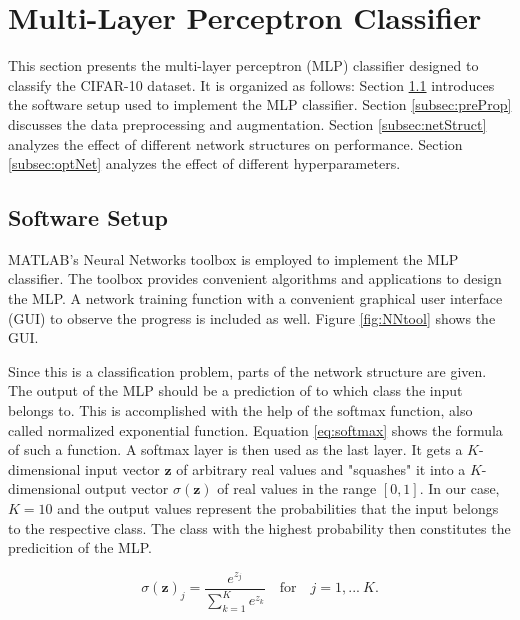 \section{Multi-Layer Perceptron Classifier}
	    \pagestyle{mario}

This section presents the multi-layer perceptron (MLP) classifier designed to classify the CIFAR-10 dataset. It is organized as follows: Section \ref{subsec:setup} introduces the software setup used to implement the MLP classifier. Section \ref{subsec:preProp} discusses the data preprocessing and augmentation. Section \ref{subsec:netStruct} analyzes the effect of different network structures on performance. Section \ref{subsec:optNet} analyzes the effect of different hyperparameters.

\subsection{Software Setup}\label{subsec:setup}

MATLAB's Neural Networks toolbox is employed to implement the MLP classifier. The toolbox provides convenient algorithms and applications to design the MLP. A network training function with a convenient graphical user interface (GUI) to observe the progress is included as well. Figure \ref{fig:NNtool} shows the GUI.

Since this is a classification problem, parts of the network structure are given. The output of the MLP should be a prediction of to which class the input belongs to. This is accomplished with the help of the softmax function, also called normalized exponential function. Equation \ref{eq:softmax} shows the formula of such a function. A softmax layer is then used as the last layer. It gets a $K$-dimensional input vector $\boldsymbol{z}$ of arbitrary real values and "squashes" it into a $K$-dimensional output vector $\sigma(\boldsymbol{z})$ of real values in the range $[0,1]$. In our case, $K=10$ and the output values represent the probabilities that the input belongs to the respective class. The class with the highest probability then constitutes the predicition of the MLP.

\begin{equation}\label{eq:softmax}
\sigma(\boldsymbol{z})_j = \frac{e^{z_j}}{\sum_{k=1}^{K}e^{z_k}}\quad \textrm{for}\quad j = 1,...~K.
\end{equation}

